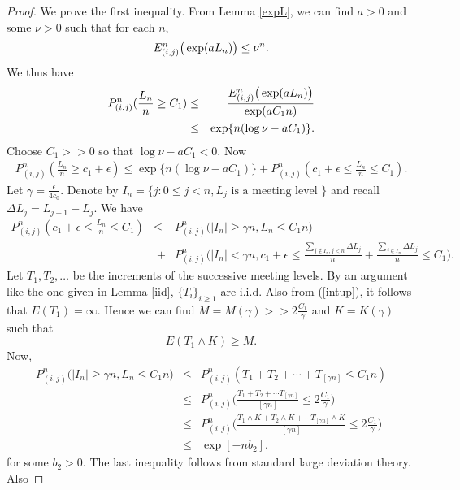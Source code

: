 \documentclass[11pt]{amsart}
\begin{document}
\begin{proof}
 We prove the first inequality. From Lemma \ref{expL}, we can find $a>0$ and some $\nu>0$ such that for each $n$,
 \[ E_{(i,j)}^n\big{(} \exp (a L_n)\big{)} \le \nu^n. \]
 We thus have 
 \begin{eqnarray*}
 P_{(i,j)}^n(\frac{L_n}{n} \ge C_1) & \le& \frac{E_{(i,j)}^n\big{(}\exp (a L_n) \big{)}}{ \exp(aC_1n)}\\
 &\le  & \exp \{ n(\log \nu - aC_1)\}.
 \end{eqnarray*}
 Choose $C_1 >>0$ so that $\log \nu -aC_1 <0$. Now  
\begin{eqnarray*}
\label{1}
P_{(i,j)}^n(\frac{L_n}{n} \ge c_1+\epsilon) \le \exp\{n(\log \nu - a C_1)\} +P_{(i,j)}^n(c_1+\epsilon \le \frac{L_n}{n} \le C_1). 
\end{eqnarray*}
Let $\gamma=\frac{\epsilon}{4c_0}$. Denote by $I_n = \{ j: 0\le j < n, L_j \mbox{ is a meeting level } \}$ and recall $\Delta L_j =L_{j+1}-L_j$. We have 
\begin{eqnarray*}
\label{2}
P_{(i,j)}^n( c_1 +\epsilon \le \frac{L_n}{n} \le C_1 ) &\le& P_{(i,j)}^n \big(  \vert I_n \vert \ge \gamma n,L_n \le C_1n \big) \\
&\;+&P_{(i,j)}^n\Big( \vert I_n \vert < \gamma n, c_1+\epsilon \le \frac{ \sum_{ j \notin I_n, j <n } \Delta L_j }{n} + \frac{ \sum_{ j \in I_n } \Delta L_j }{n} \le C_1 \Big).
\end{eqnarray*}
Let $T_1,T_2,\dots$ be the increments of the successive meeting levels. By an argument like the one given in Lemma \ref{iid}, $\{T_i \}_{i \ge 1} $ are i.i.d. Also from (\ref{intup}), it follows that $E(T_1)=\infty$. Hence we can find $M=M(\gamma) >>2\frac{C_1}{\gamma}$ and $K=K(\gamma)$ such that 
\[E(T_1\wedge K)\ge M.\]
Now,
\begin{eqnarray*}
P_{(i,j)}^n \big( \vert I_n \vert \ge \gamma n , L_n \le C_1 n \big) &\le& P_{(i,j)}^n(T_1 +T_2+\cdots+T_{[\gamma n]} \le C_1n) \\
&\le& P_{(i,j)}^n \Big( \frac{T_1 +T_2 +\cdots T_{[\gamma n]} }{[\gamma n]} \le 2\frac{C_1}{\gamma} \Big)\\
&\le& P_{(i,j)}^n \Big( \frac{T_1 \wedge K +T_2\wedge K +\cdots T_{[\gamma n]} \wedge K }{[\gamma n]} \le 2\frac{C_1}{\gamma} \Big)\\
&\le&  \exp[-nb_2].
\end{eqnarray*} 
for some $b_2 >0$. The last inequality follows from standard large deviation theory. Also


\end{proof}
\end{document}
